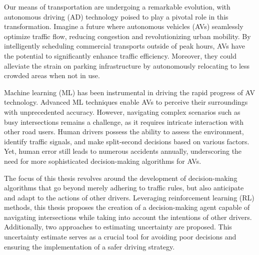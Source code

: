 Our means of transportation are undergoing a remarkable evolution, with autonomous driving (AD) technology poised to play a pivotal role in this transformation. Imagine a future where autonomous vehicles (AVs) seamlessly optimize traffic flow, reducing congestion and revolutionizing urban mobility. By intelligently scheduling commercial transports outside of peak hours, AVs have the potential to significantly enhance traffic efficiency. Moreover, they could alleviate the strain on parking infrastructure by autonomously relocating to less crowded areas when not in use.

Machine learning (ML) has been instrumental in driving the rapid progress of AV technology. Advanced ML techniques enable AVs to perceive their surroundings with unprecedented accuracy. However, navigating complex scenarios such as busy intersections remains a challenge, as it requires intricate interaction with other road users. Human drivers possess the ability to assess the environment, identify traffic signals, and make split-second decisions based on various factors. Yet, human error still leads to numerous accidents annually, underscoring the need for more sophisticated decision-making algorithms for AVs.

The focus of this thesis revolves around the development of decision-making algorithms that go beyond merely adhering to traffic rules, but also anticipate and adapt to the actions of other drivers. Leveraging reinforcement learning (RL) methods, this thesis proposes the creation of a decision-making agent capable of navigating intersections while taking into account the intentions of other drivers. Additionally, two approaches to estimating uncertainty are proposed. This uncertainty estimate serves as a crucial tool for avoiding poor decisions and ensuring the implementation of a safer driving strategy.